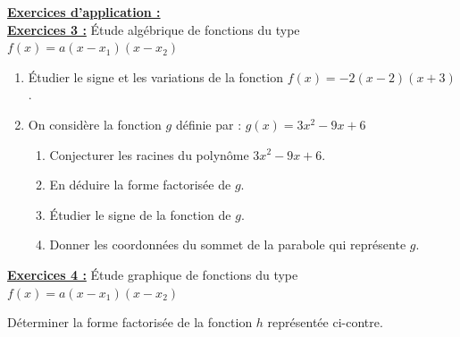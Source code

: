 \documentclass[12pt]{article}
\begin{document}
\begin{mdframed}[
    linewidth=1pt,
    roundcorner=5pt,
    linecolor=blue,
]
    \vspace{5pt}
    \underline{\textbf{Exercices d'application :}} 
    \vspace{10pt}
    \\\underline{\textbf{Exercices 3 :}} Étude algébrique de fonctions du type $f(x)=a(x-x_1)(x-x_2)$
    \vspace{5pt}
    \begin{enumerate}
        \item Étudier le signe et les variations de la fonction $f(x) = -2(x-2)(x+3)$.
        \item On considère la fonction $g$ définie par : $g(x) = 3x^2-9x+6$
        \begin{enumerate}
            \item Conjecturer les racines du polynôme $3x^2-9x+6$.
            \item En déduire la forme factorisée de $g$.
            \item Étudier le signe de la fonction de $g$.
            \item Donner les coordonnées du sommet de la parabole qui représente $g$.
        \end{enumerate}
    \end{enumerate}
    \vspace{10pt}
    \underline{\textbf{Exercices 4 :}} Étude graphique de fonctions du type $f(x)=a(x-x_1)(x-x_2)$\\
    \vspace{5pt}
    \begin{minipage}{.45\textwidth}%
    Déterminer la forme factorisée de la fonction $h$ représentée ci-contre.
    \end{minipage}%
    \hfill
    \begin{minipage}{.5\textwidth}%
    \begin{center}
    \end{center}
    \end{minipage}%
    
\end{mdframed}
\end{document}
